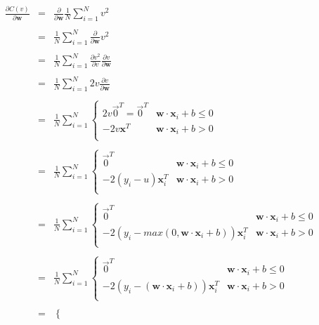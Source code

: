 \documentclass[11pt]{article}
\begin{document}
\begin{eqnarray*}
\frac{\partial C(v)}{\partial \mathbf{w}} & = & \frac{\partial }{\partial \mathbf{w}}\frac{1}{N} \sum_{i=1}^N v^2\\\\
 & = & \frac{1}{N} \sum_{i=1}^N \frac{\partial}{\partial \mathbf{w}} v^2\\\\
 & = & \frac{1}{N} \sum_{i=1}^N \frac{\partial v^2}{\partial v} \frac{\partial v}{\partial \mathbf{w}} \\\\
 & = & \frac{1}{N} \sum_{i=1}^N 2v \frac{\partial v}{\partial \mathbf{w}} \\\\
 & = & \frac{1}{N} \sum_{i=1}^N \begin{cases}
	2v\vec{0}^T = \vec{0}^T & \mathbf{w} \cdot \mathbf{x}_i + b \leq 0\\
	-2v\mathbf{x}^T & \mathbf{w} \cdot \mathbf{x}_i + b > 0\\
\end{cases}\\\\
 & = & \frac{1}{N} \sum_{i=1}^N \begin{cases}
	\vec{0}^T & \mathbf{w} \cdot \mathbf{x}_i + b \leq 0\\
	-2(y_i-u)\mathbf{x}_i^T & \mathbf{w} \cdot \mathbf{x}_i + b > 0\\
\end{cases}\\\\
 & = & \frac{1}{N} \sum_{i=1}^N \begin{cases}
	\vec{0}^T & \mathbf{w} \cdot \mathbf{x}_i + b \leq 0\\
	-2(y_i-max(0, \mathbf{w}\cdot\mathbf{x}_i+b))\mathbf{x}_i^T & \mathbf{w} \cdot \mathbf{x}_i + b > 0\\
\end{cases}\\\\
\phantom{\frac{\partial C(v)}{\partial \mathbf{w}}} & = & \frac{1}{N} \sum_{i=1}^N \begin{cases}
	\vec{0}^T & \mathbf{w} \cdot \mathbf{x}_i + b \leq 0\\
	-2(y_i-(\mathbf{w}\cdot\mathbf{x}_i+b))\mathbf{x}_i^T & \mathbf{w} \cdot \mathbf{x}_i + b > 0\\
\end{cases}\\\\
 & = & \begin{cases}

\end{cases}
\end{eqnarray*}
\end{document}
